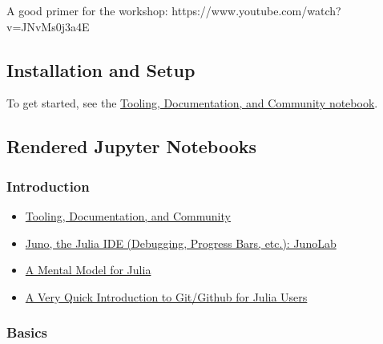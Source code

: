 \documentclass[11pt]{article}
\begin{document}
A good primer for the workshop:
https://www.youtube.com/watch?v=JNvMs0j3a4E

    \subsection{Installation and Setup}\label{installation-and-setup}

To get started, see the
\href{http://ucidatascienceinitiative.github.io/IntroToJulia/Html/ToolingDocumentationCommunity}{Tooling,
Documentation, and Community notebook}.

    \subsection{Rendered Jupyter
Notebooks}\label{rendered-jupyter-notebooks}

\subsubsection{Introduction}\label{introduction}

\begin{itemize}
\itemsep1pt\parskip0pt
\item
  \href{http://ucidatascienceinitiative.github.io/IntroToJulia/Html/ToolingDocumentationCommunity}{Tooling,
  Documentation, and Community}
\item
  \href{http://docs.junolab.org/latest/}{Juno, the Julia IDE (Debugging,
  Progress Bars, etc.): JunoLab}
\item
  \href{http://ucidatascienceinitiative.github.io/IntroToJulia/Html/JuliaMentalModel}{A
  Mental Model for Julia}
\item
  \href{http://ucidatascienceinitiative.github.io/IntroToJulia/Html/GithubIntroduction}{A
  Very Quick Introduction to Git/Github for Julia Users}
\end{itemize}

\subsubsection{Basics}\label{basics}
\end{document}
